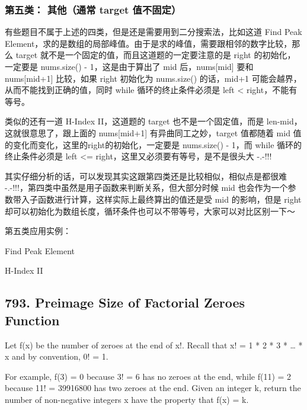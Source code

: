 \documentclass[9pt, b5paper]{article}
\begin{document}
\subsubsection{第五类： 其他（通常 target 值不固定）}
\label{sec-14-1-5}

有些题目不属于上述的四类，但是还是需要用到二分搜索法，比如这道 Find Peak Element，求的是数组的局部峰值。由于是求的峰值，需要跟相邻的数字比较，那么 target 就不是一个固定的值，而且这道题的一定要注意的是 right 的初始化，一定要是 nums.size() - 1，这是由于算出了 mid 后，nums[mid] 要和 nums[mid+1] 比较，如果 right 初始化为 nums.size() 的话，mid+1 可能会越界，从而不能找到正确的值，同时 while 循环的终止条件必须是 left < right，不能有等号。

类似的还有一道 H-Index II，这道题的 target 也不是一个固定值，而是 len-mid，这就很意思了，跟上面的 nums[mid+1] 有异曲同工之妙，target 值都随着 mid 值的变化而变化，这里的right的初始化，一定要是 nums.size() - 1，而 while 循环的终止条件必须是 left <= right，这里又必须要有等号，是不是很头大 -.-!!!

其实仔细分析的话，可以发现其实这跟第四类还是比较相似，相似点是都很难 -.-!!!，第四类中虽然是用子函数来判断关系，但大部分时候 mid 也会作为一个参数带入子函数进行计算，这样实际上最终算出的值还是受 mid 的影响，但是 right 却可以初始化为数组长度，循环条件也可以不带等号，大家可以对比区别一下～

第五类应用实例：

Find Peak Element

H-Index II

\subsection{793. Preimage Size of Factorial Zeroes Function}
\label{sec-14-2}
Let f(x) be the number of zeroes at the end of x!. Recall that x! = 1 * 2 * 3 * \ldots{} * x and by convention, 0! = 1.

For example, f(3) = 0 because 3! = 6 has no zeroes at the end, while f(11) = 2 because 11! = 39916800 has two zeroes at the end.
Given an integer k, return the number of non-negative integers x have the property that f(x) = k.
\end{document}
